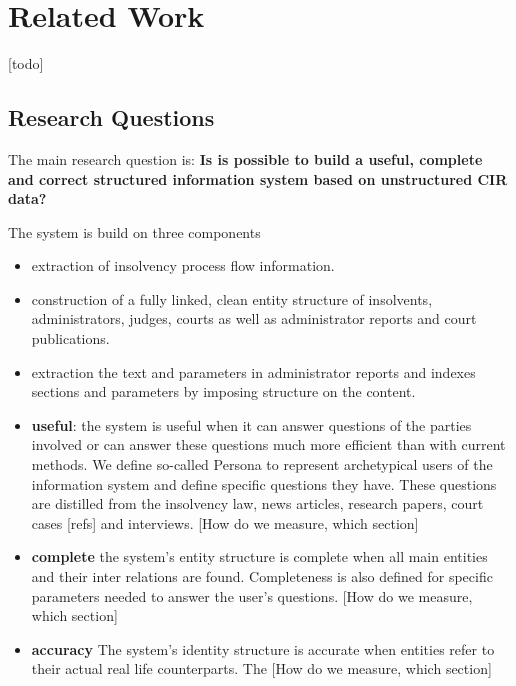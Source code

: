 \section{Related Work}
[todo]

\subsection{Research Questions}
The main research question is:
\textbf{Is is possible to build a useful, complete and correct structured information system based on unstructured CIR data?}

The system is build on three components
\begin{itemize}
\item extraction of insolvency process flow information.
\item construction of a fully linked, clean entity structure of insolvents, administrators, judges, courts as well as administrator reports and court publications.
\item extraction the text and parameters in administrator reports and indexes sections and parameters by imposing structure on the content.
\end{itemize} 

\begin{itemize}
\item \textbf{useful}: the system is useful when it can answer questions of the parties involved or can answer these questions much more efficient than with current methods. We define so-called Persona to represent archetypical users of the information system and define specific questions they have. These questions are distilled from the insolvency law, news articles, research papers, court cases [refs] and interviews. [How do we measure, which section]
\item \textbf{complete} the system's entity structure is complete when all main entities and their inter relations are found. Completeness is also defined for specific parameters needed to answer the user's questions. [How do we measure, which section]
\item \textbf{accuracy} The system's identity structure is accurate when entities refer to their actual real life counterparts. The [How do we measure, which section]


\end{itemize}


